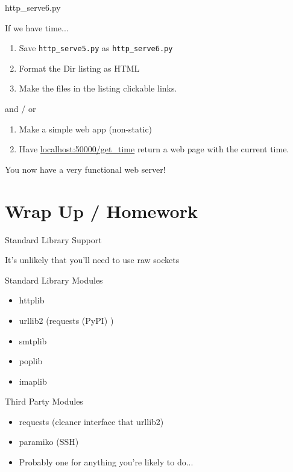 \documentclass{beamer}
\begin{document}
\begin{frame}[fragile]{http\_serve6.py}

{\Large If we have time...}
\begin{enumerate}
  \item Save \verb|http_serve5.py|  as \verb|http_serve6.py|
  \item Format the Dir listing as HTML
  \item Make the files in the listing clickable links.
\end{enumerate}
 and / or
\begin{enumerate}
  \item Make a simple web app (non-static)
  \item Have \url{localhost:50000/get_time} return a web page with the current time.
\end{enumerate}
\vfill
{\Large You now have a very functional web server!} 
\end{frame}

\section{Wrap Up / Homework}

\begin{frame}[fragile]{Standard Library Support}

{\Large It's unlikely that you'll need to use raw sockets}

\vfill
{\Large Standard Library Modules}
\begin{itemize}
  \item httplib
  \item urllib2 (requests (PyPI) )
  \item smtplib
  \item poplib
  \item imaplib
\end{itemize}

{\Large Third Party Modules}
\begin{itemize}
  \item requests (cleaner interface that urllib2)
  \item paramiko (SSH)
  \item Probably one for anything you're likely to do...
\end{itemize}
  
\end{frame}
\end{document}
